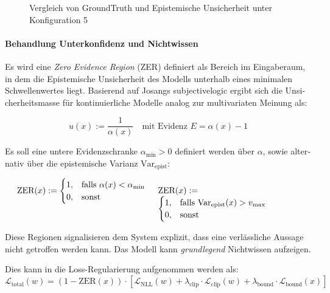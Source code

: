 \begin{otherlanguage}{ngerman}
\begin{figure}[!ht]
  \caption{Vergleich von \gls{GroundTruth} und \gls{Epistemische Unsicherheit} unter Konfiguration 5}
  \label{fig:two_subfigures5}
\end{figure}



\paragraph{Behandlung Unterkonfidenz und Nichtwissen} Es wird eine \textit{Zero Evidence Region} (ZER) definiert als Bereich im Eingaberaum, in dem die \gls{Epistemische Unsicherheit} des Modells unterhalb eines minimalen Schwellenwertes liegt. Basierend auf Josangs \gls{subjectivelogic} ergibt sich die Unsicherheitsmasse für kontinuierliche Modelle analog zur multivariaten Meinung als:

\[
u(x) := \frac{1}{\alpha(x)} \quad \text{mit Evidenz } E = \alpha(x) - 1
\]

Es soll eine untere Evidenzschranke \( \alpha_{\min} > 0 \) definiert werden über $\alpha$, sowie alternativ über die epistemische Varianz $\text{Var}_{\text{epist}}$:

\begin{equation*}
\begin{minipage}[t]{0.48\linewidth}
\raggedright
$\displaystyle
\text{ZER}(x) := 
\begin{cases}
1, & \text{falls } \alpha(x) < \alpha_{\min} \\
0, & \text{sonst}
\end{cases}
$
\end{minipage}
\hfill
\begin{minipage}[t]{0.48\linewidth}
\raggedright
$\displaystyle
\text{ZER}(x) := 
\begin{cases}
1, & \text{falls } \text{Var}_{\text{epist}}(x) > v_{\max} \\
0, & \text{sonst}
\end{cases}
$
\end{minipage}
\end{equation*}

Diese Regionen signalisieren dem System explizit, dass eine verlässliche Aussage nicht getroffen werden kann. Das Modell kann \textit{grundlegend} Nichtwissen aufzeigen. 

Dies kann in die Loss-Regularierung aufgenommen werden als: 
\[
\mathcal{L}_{\text{total}}(w) = 
(1 - \text{ZER}(x)) \cdot \left[ 
\mathcal{L}_{\text{NLL}}(w) 
+ \lambda_{\text{clip}} \cdot \mathcal{L}_{\text{clip}}(w) 
+ \lambda_{\text{bound}} \cdot \mathcal{L}_{\text{bound}}(x) 
\right]
\]


\end{otherlanguage}
